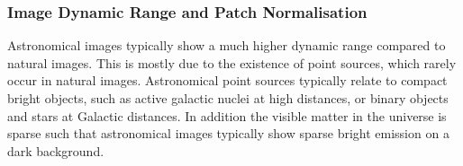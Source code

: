\documentclass[twocolumn]{aastex631}
\begin{document}
    



    

    \subsubsection{Image Dynamic Range and Patch Normalisation}
    \label{ssec:patch-norm}
    Astronomical images typically show a much higher dynamic range compared to natural images. This is mostly due to the existence of point sources, which rarely occur in natural images. Astronomical point sources typically relate to compact bright objects, such as active galactic nuclei at high distances, or binary objects and stars at Galactic distances. In addition the visible matter in the universe is sparse such that astronomical images typically show sparse bright emission on a dark background. 
\end{document}
